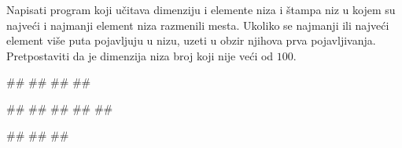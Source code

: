 \begin{Exercise}[label=p.razmena_min_max] 
  Napisati program koji učitava dimenziju i elemente niza i štampa niz
  u kojem su najveći i najmanji element niza razmenili mesta. Ukoliko
  se najmanji ili najveći element više puta pojavljuju u nizu, uzeti u
  obzir njihova prva pojavljivanja. Pretpostaviti da je dimenzija niza
  broj koji nije veći od $100$.
  
\begin{miditest}
\begin{upotreba}{1}
#\naslovInt#
##
##
##
\end{upotreba}
\end{miditest}
\begin{miditest}
\begin{upotreba}{2}
#\naslovInt#
##
##
##
##
\end{upotreba}
\end{miditest}

\begin{miditest}
\begin{upotreba}{3}
#\naslovInt#
##
##
\end{upotreba}
\end{miditest}
\end{Exercise}

\ifresenja
\begin{Answer}[ref=p.razmena_min_max]
\end{Answer}
\fi

